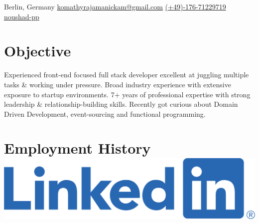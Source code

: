 \documentclass{resume_base}
\begin{document}
	\contact
		{\color{\themeColor} \iconSpace \small {} \color{black}Berlin, Germany}
		{\color{\themeColor} \iconSpace \small {} \href{mailto://komathyrajamanickam@gmail.com}{komathyrajamanickam@gmail.com}}
		{\color{\themeColor} \iconSpace \small {}  \href{tel://+4917671229719}{(+49)-176-71229719}}
		{\color{\themeColor} \iconSpace \small {} \href{https://github.com/noushad-pp/}{noushad-pp}}
	\section{Objective}\label{sec:objective}
		\hspace{1pt}\parbox{0.99\textwidth}{
			Experienced front-end focused full stack developer excellent at juggling multiple tasks \& working under pressure. Broad industry experience with extensive exposure to startup environments. 7+ years of professional expertise with strong leadership \& relationship-building skills. Recently got curious about Domain Driven Development, event-sourcing and functional programming.
		}

	\section{Employment History \hfill  {\small \href{https://www.linkedin.com/in/komathy-rajamanickam/}{\includegraphics[scale=0.075]{LI-Logo}}}}\label{sec:work-experience}

		\\
\end{document}
